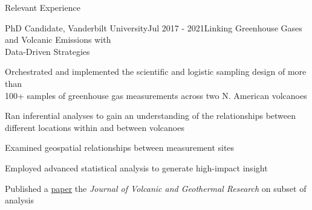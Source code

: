 \documentclass{resume} %
\newcommand{\commentblock}[1]{}
\begin{document}
\begin{rSection}{Relevant Experience}
\commentblock{
    \begin{rSubsection}{PhD Candidate, Vanderbilt University}{May 2019 - 2021}{Collaborating with National Oceanographic and Atmospheric Administration (NOAA)}{Oak Ridge, TN}
    \item {Processed GBs of data from gas measurements taking place over the course of a year}
    \item {With Python (e.g. pandas, scikit-learn), the data was wrangled, cleaned, \\ and analyzed to illustrate key insights from the study}
    \item {Employing advanced statistical analyses on large time series data sets}
    \item {Used random forest and other ML techniques modeling to fill gaps of missing data \\ within the time series data sets}
    
    \end{rSubsection}
}


\begin{rSubsection}{PhD Candidate, Vanderbilt University}{Jul 2017 - 2021}{Linking Greenhouse Gases and Volcanic Emissions with \\ Data-Driven Strategies}{}
\item {Orchestrated and implemented the scientific and logistic sampling design of more than \\ 100+ samples of greenhouse gas measurements across two N. American volcanoes}
\item {Ran inferential analyses to gain an understanding of the relationships between \\ different locations within and between volcanoes}
\item {Examined geospatial relationships between measurement sites}
\item {Employed advanced statistical analysis to generate high-impact insight}
\item {Published a \href{https://www.sciencedirect.com/science/article/abs/pii/S0377027321000627#preview-section-abstract}{paper} the \emph{Journal of Volcanic and Geothermal Research} on subset of analysis}

\end{rSubsection}



\end{rSection}
\end{document}
